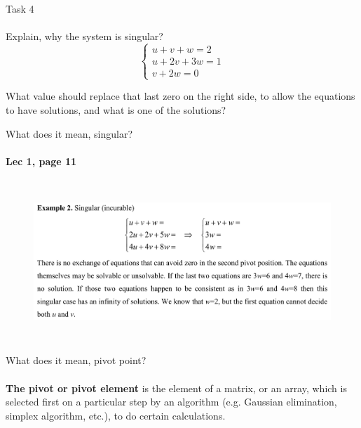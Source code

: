 \documentclass[aspectratio=169]{beamer}
\begin{document}
\begin{frame}[t, label=task4]{Task 4}
\framesubtitle{}
    Explain, why the system is singular?
    \begin{equation*}
    \left\{\begin{matrix}
        u + v + w = 2 \\ 
        u + 2v + 3w = 1 \\ 
        v + 2w = 0 
        \end{matrix}\right.
    \end{equation*}

    What value should replace that last zero on the right side, to allow the equations to have solutions, and what is one of the solutions?
\end{frame}

\begin{frame}[t]{What does it mean, singular?}
\framesubtitle{Lec 1, page 11}
    \begin{figure}[H]
        \centering\includegraphics[height=6cm,width=1\textwidth,keepaspectratio]{1.png}
        \label{fig:1.png}
    \end{figure}
\end{frame}

\begin{frame}[t]{What does it mean, pivot point?}
\framesubtitle{}
    \Large
    \begin{definition}
        \textbf{The pivot or pivot element} is the element of a matrix, or an array, which is selected first on a particular step by an algorithm (e.g. Gaussian elimination, simplex algorithm, etc.), to do certain calculations.
    \end{definition}
\end{frame}

\end{document}
